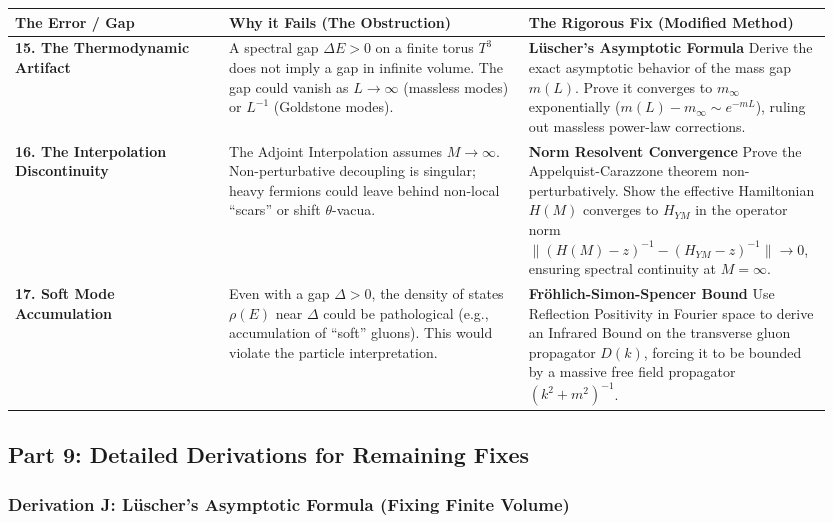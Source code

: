 \begin{center}
\begin{tabular}{|p{0.25\linewidth}|p{0.35\linewidth}|p{0.35\linewidth}|}
\hline
\textbf{The Error / Gap} & \textbf{Why it Fails (The Obstruction)} & \textbf{The Rigorous Fix (Modified Method)} \\
\hline
\textbf{15. The Thermodynamic Artifact} & A spectral gap $\Delta E > 0$ on a finite torus $T^3$ does not imply a gap in infinite volume. The gap could vanish as $L \to \infty$ (massless modes) or $L^{-1}$ (Goldstone modes). & \textbf{Lüscher's Asymptotic Formula} \newline Derive the exact asymptotic behavior of the mass gap $m(L)$. Prove it converges to $m_{\infty}$ exponentially ($m(L) - m_{\infty} \sim e^{-m L}$), ruling out massless power-law corrections. \\
\hline
\textbf{16. The Interpolation Discontinuity} & The Adjoint Interpolation assumes $M \to \infty$. Non-perturbative decoupling is singular; heavy fermions could leave behind non-local ``scars'' or shift $\theta$-vacua. & \textbf{Norm Resolvent Convergence} \newline Prove the Appelquist-Carazzone theorem non-perturbatively. Show the effective Hamiltonian $H(M)$ converges to $H_{YM}$ in the operator norm $\| (H(M)-z)^{-1} - (H_{YM}-z)^{-1} \| \to 0$, ensuring spectral continuity at $M=\infty$. \\
\hline
\textbf{17. Soft Mode Accumulation} & Even with a gap $\Delta > 0$, the density of states $\rho(E)$ near $\Delta$ could be pathological (e.g., accumulation of ``soft'' gluons). This would violate the particle interpretation. & \textbf{Fröhlich-Simon-Spencer Bound} \newline Use Reflection Positivity in Fourier space to derive an Infrared Bound on the transverse gluon propagator $D(k)$, forcing it to be bounded by a massive free field propagator $(k^2+m^2)^{-1}$. \\
\hline
\end{tabular}
\end{center}

\subsection{Part 9: Detailed Derivations for Remaining Fixes}

\subsubsection{Derivation J: Lüscher's Asymptotic Formula (Fixing Finite Volume)}

